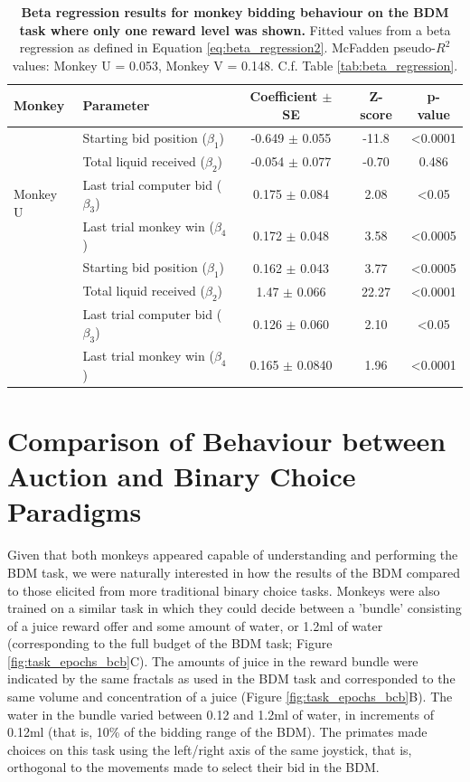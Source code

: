 \begin{table}[htbp]
    \centering
    \begin{tabular}{llccc}
        \hline
        \textbf{Monkey} & \textbf{Parameter} & \textbf{Coefficient $\pm$ SE} & \textbf{Z-score} & \textbf{p-value} \\
        \hline
        \multirow{5}{*}{Monkey U} & 
        Starting bid position ($\beta_1$) & -0.649 $\pm$ 0.055 & -11.8 & <0.0001 \\
        & Total liquid received ($\beta_2$) & -0.054 $\pm$ 0.077 & -0.70 & 0.486 \\
        & Last trial computer bid ($\beta_3$) & 0.175 $\pm$ 0.084 & 2.08 & <0.05 \\
        & Last trial monkey win ($\beta_4$) & 0.172 $\pm$ 0.048 & 3.58 & <0.0005 \\
        \hline
        \multirow{5}{*}{Monkey V} & 
        Starting bid position ($\beta_1$) & 0.162 $\pm$ 0.043 & 3.77 & <0.0005 \\
        & Total liquid received ($\beta_2$) & 1.47 $\pm$ 0.066 & 22.27 & <0.0001 \\
        & Last trial computer bid ($\beta_3$) & 0.126 $\pm$ 0.060 & 2.10 & <0.05 \\
        & Last trial monkey win ($\beta_4$) & 0.165 $\pm$ 0.0840& 1.96 & <0.0001 \\
        \hline
    \end{tabular}
\caption[Beta regression results for monkey bidding behaviour on the BDM task where only one reward level was shown.]{\textbf{Beta regression results for monkey bidding behaviour on the BDM task where only one reward level was shown.} Fitted values from a beta regression as defined in Equation \ref{eq:beta_regression2}. McFadden pseudo-$R^2$ values: Monkey U = 0.053, Monkey V = 0.148. C.f. Table \ref{tab:beta_regression}.}
    \label{tab:beta_regression2}
\end{table}

\clearpage
\section{Comparison of Behaviour between Auction and Binary Choice Paradigms}

Given that both monkeys appeared capable of understanding and performing the BDM task, we were naturally interested in how the results of the BDM compared to those elicited from more traditional binary choice tasks. Monkeys were also trained on a similar task in which they could decide between a 'bundle' consisting of a juice reward offer and some amount of water, or 1.2ml of water (corresponding to the full budget of the BDM task; Figure \ref{fig:task_epochs_bcb}C). The amounts of juice in the reward bundle were indicated by the same fractals as used in the BDM task and corresponded to the same volume and concentration of a juice (Figure \ref{fig:task_epochs_bcb}B). The water in the bundle varied between 0.12 and 1.2ml of water, in increments of 0.12ml (that is, 10\% of the bidding range of the BDM). The primates made choices on this task using the left/right axis of the same joystick, that is, orthogonal to the movements made to select their bid in the BDM.

